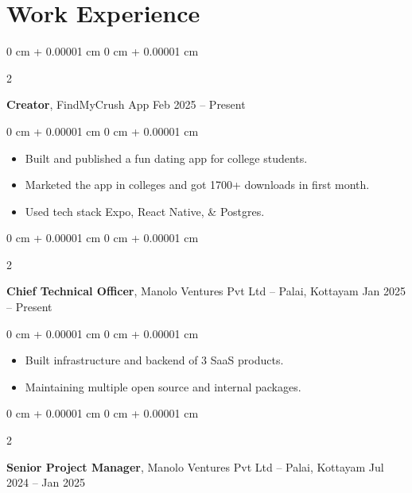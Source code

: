 \documentclass[10pt, letterpaper]{article}
\newenvironment{highlights}{
    \begin{itemize}[
        topsep=0.10 cm,
        parsep=0.10 cm,
        partopsep=0pt,
        itemsep=0pt,
        leftmargin=0 cm + 10pt
    ]
}{
    \end{itemize}
} %
\newenvironment{onecolentry}{
    \begin{adjustwidth}{
        0 cm + 0.00001 cm
    }{
        0 cm + 0.00001 cm
    }
}{
    \end{adjustwidth}
} %
\newenvironment{twocolentry}[2][]{
    \onecolentry
    \def\secondColumn{#2}
    \setcolumnwidth{\fill, 4.5 cm}
    \begin{paracol}{2}
}{
    \switchcolumn \raggedleft \secondColumn
    \end{paracol}
    \endonecolentry
} %
\begin{document}

\section{Work Experience}

\begin{twocolentry}{
		Feb 2025 – Present
	}
	\textbf{Creator}, FindMyCrush App\end{twocolentry}

\vspace{0.10 cm}
\begin{onecolentry}
	\begin{highlights}
		\item Built and published a fun dating app for college students.
		\item Marketed the app in colleges and got 1700+ downloads in first month.
		\item Used tech stack Expo, React Native, \& Postgres.
	\end{highlights}
\end{onecolentry}

\begin{twocolentry}{
		Jan 2025 – Present
	}
	\textbf{Chief Technical Officer}, Manolo Ventures Pvt Ltd -- Palai, Kottayam\end{twocolentry}

\vspace{0.10 cm}
\begin{onecolentry}
	\begin{highlights}
		\item Built infrastructure and backend of 3 SaaS products.
		\item Maintaining multiple open source and internal packages.
	\end{highlights}
\end{onecolentry}

\vspace{0.2 cm}

\begin{twocolentry}{
		Jul 2024 – Jan 2025
	}
	\textbf{Senior Project Manager}, Manolo Ventures Pvt Ltd -- Palai, Kottayam\end{twocolentry}
\end{document}
